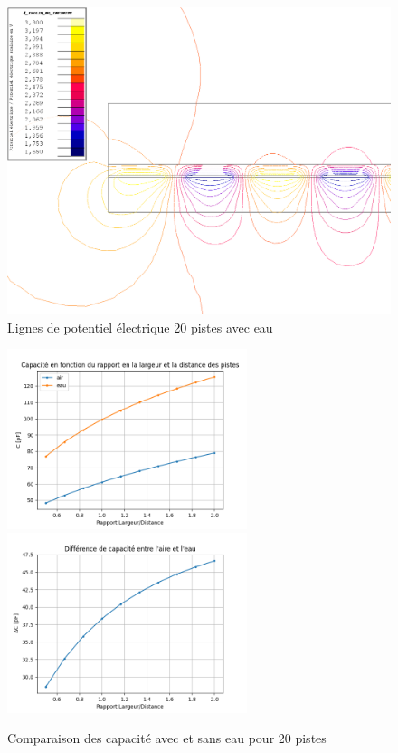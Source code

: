 \begin{figure}[!ht]
 \centering
 \includegraphics[width=14cm]{C20eauligne.png}
 \caption{Lignes de potentiel électrique 20 pistes avec eau}
 \label{c20eaul}
\end{figure}

\begin{figure}[!ht]
 \centering
 \includegraphics[width=7cm]{C20eauGraph1.png}
 \includegraphics[width=7cm]{C20eauGraph2.png}
 \caption{Comparaison des capacité avec et sans eau pour 20 pistes}
\end{figure}

